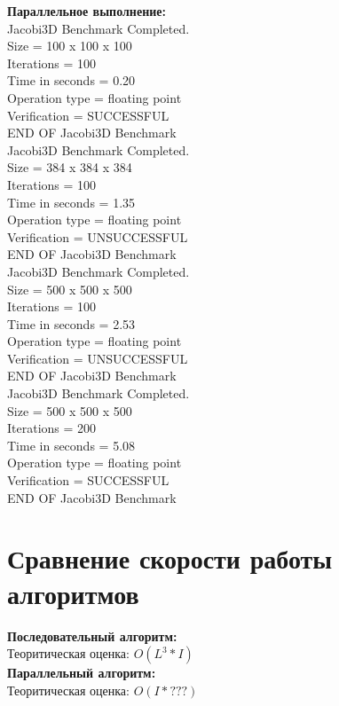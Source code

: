 \documentclass[a4paper,12pt,titlepage,draft]{article}
\begin{document}
\begin{minipage}{.45\textwidth}
\textbf{Параллельное выполнение:}\\

 Jacobi3D Benchmark Completed.\\
 Size            =  100 x  100 x  100\\
 Iterations      =                100\\
 Time in seconds =               0.20\\
 Operation type  =     floating point\\
 Verification    =         SUCCESSFUL\\
 END OF Jacobi3D Benchmark\\

Jacobi3D Benchmark Completed.\\
 Size            =  384 x  384 x  384\\
 Iterations      =                100\\
 Time in seconds =               1.35\\
 Operation type  =     floating point\\
 Verification    =       UNSUCCESSFUL\\
 END OF Jacobi3D Benchmark\\

 Jacobi3D Benchmark Completed.\\
 Size            =  500 x  500 x  500\\
 Iterations      =                100\\
 Time in seconds =               2.53\\
 Operation type  =     floating point\\
 Verification    =       UNSUCCESSFUL\\
 END OF Jacobi3D Benchmark\\

 Jacobi3D Benchmark Completed.\\
 Size            =  500 x  500 x  500\\
 Iterations      =                200\\
 Time in seconds =               5.08\\
 Operation type  =     floating point\\
 Verification    =         SUCCESSFUL\\
 END OF Jacobi3D Benchmark\\

\end{minipage}

\newpage
\section{Сравнение скорости работы алгоритмов}
\textbf{Последовательный алгоритм:}\\

Теоритическая оценка: $O(L^3 * I)$\\

\textbf{Параллельный алгоритм:}\\

Теоритическая оценка: $O(I * ???)$
\end{document}
